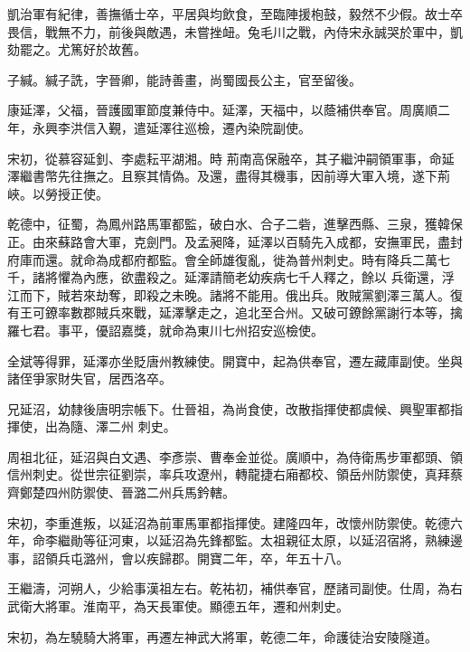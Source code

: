 \begin{pinyinscope}
 凱治軍有紀律，善撫循士卒，平居與均飲食，至臨陣援枹鼓，毅然不少假。故士卒畏信，戰無不力，前後與敵遇，未嘗挫衄。兔毛川之戰，內侍宋永誠哭於軍中，凱劾罷之。尤篤好於故舊。



 子緘。緘子詵，字晉卿，能詩善畫，尚蜀國長公主，官至留後。



 康延澤，父福，晉護國軍節度兼侍中。延澤，天福中，以蔭補供奉官。周廣順二年，永興李洪信入覲，遣延澤往巡檢，遷內染院副使。



 宋初，從慕容延釗、李處耘平湖湘。時
 荊南高保融卒，其子繼沖嗣領軍事，命延澤繼書幣先往撫之。且察其情偽。及還，盡得其機事，因前導大軍入境，遂下荊峽。以勞授正使。



 乾德中，征蜀，為鳳州路馬軍都監，破白水、合子二砦，進擊西縣、三泉，獲韓保正。由來蘇路會大軍，克劍門。及孟昶降，延澤以百騎先入成都，安撫軍民，盡封府庫而還。就命為成都府都監。會全師雄復亂，徙為普州刺史。時有降兵二萬七千，諸將懼為內應，欲盡殺之。延澤請簡老幼疾病七千人釋之，餘以
 兵衛還，浮江而下，賊若來劫奪，即殺之未晚。諸將不能用。俄出兵。敗賊黨劉澤三萬人。復有王可鐐率數郡賊兵來戰，延澤擊走之，追北至合州。又破可鐐餘黨謝行本等，擒羅七君。事平，優詔嘉獎，就命為東川七州招安巡檢使。



 全斌等得罪，延澤亦坐貶唐州教練使。開寶中，起為供奉官，遷左藏庫副使。坐與諸侄爭家財失官，居西洛卒。



 兄延沼，幼隸後唐明宗帳下。仕晉祖，為尚食使，改散指揮使都虞候、興聖軍都指揮使，出為隨、澤二州
 刺史。



 周祖北征，延沼與白文遇、李彥崇、曹奉金並從。廣順中，為侍衛馬步軍都頭、領信州刺史。從世宗征劉崇，率兵攻遼州，轉龍捷右廂都校、領岳州防禦使，真拜蔡齊鄭楚四州防禦使、晉潞二州兵馬鈐轄。



 宋初，李重進叛，以延沼為前軍馬軍都指揮使。建隆四年，改懷州防禦使。乾德六年，命李繼勛等征河東，以延沼為先鋒都監。太祖親征太原，以延沼宿將，熟練邊事，詔領兵屯潞州，會以疾歸郡。開寶二年，卒，年五十八。



 王繼濤，河朔人，少給事漢祖左右。乾祐初，補供奉官，歷諸司副使。仕周，為右武衛大將軍。淮南平，為天長軍使。顯德五年，遷和州刺史。



 宋初，為左驍騎大將軍，再遷左神武大將軍，乾德二年，命護徒治安陵隧道。




\end{pinyinscope}
